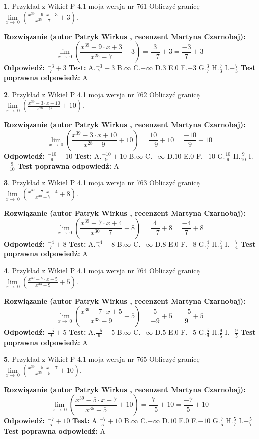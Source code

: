 \documentclass[12pt, a4paper]{article}
\theoremstyle{definition} %
\newtheorem{zad}{}
\newcommand{\zadStart}[1]{\begin{zad}#1\newline}
\newcommand{\zadStop}{\end{zad}}
\newcommand{\rozwStart}[2]{\noindent \textbf{Rozwiązanie (autor #1 , recenzent #2): }\newline}
\newcommand{\rozwStop}{\newline}
\newcommand{\odpStart}{\noindent \textbf{Odpowiedź:}\newline}
\newcommand{\odpStop}{\newline}
\newcommand{\testStart}{\noindent \textbf{Test:}\newline}
\newcommand{\testStop}{\newline}
\newcommand{\kluczStart}{\noindent \textbf{Test poprawna odpowiedź:}\newline}
\newcommand{\kluczStop}{\newline}
\begin{document}
\zadStart{Przykład z Wikieł P 4.1 moja wersja nr 761}
Obliczyć granicę $\lim\limits_{x\to\ 0}(\frac{x^{39}-9 \cdot x +3}{x^{25}-7}+3)$.
\zadStop
\rozwStart{Patryk Wirkus}{Martyna Czarnobaj}
$$\lim\limits_{x\to\ 0}(\frac{x^{39}-9 \cdot x +3}{x^{25}-7}+3)=\frac{3}{-7}+3=\frac{-3}{7}+3$$
\rozwStop
\odpStart
$\frac{-3}{7}+3$
\odpStop
\testStart
A.$\frac{-3}{7}+3$
B.$\infty$
C.$-\infty$
D.$3$
E.$0$
F.$-3$
G.$\frac{3}{7}$
H.$\frac{7}{3}$
I.$-\frac{7}{3}$
\testStop
\kluczStart
A
\kluczStop



\zadStart{Przykład z Wikieł P 4.1 moja wersja nr 762}
Obliczyć granicę $\lim\limits_{x\to\ 0}(\frac{x^{39}-3 \cdot x +10}{x^{28}-9}+10)$.
\zadStop
\rozwStart{Patryk Wirkus}{Martyna Czarnobaj}
$$\lim\limits_{x\to\ 0}(\frac{x^{39}-3 \cdot x +10}{x^{28}-9}+10)=\frac{10}{-9}+10=\frac{-10}{9}+10$$
\rozwStop
\odpStart
$\frac{-10}{9}+10$
\odpStop
\testStart
A.$\frac{-10}{9}+10$
B.$\infty$
C.$-\infty$
D.$10$
E.$0$
F.$-10$
G.$\frac{10}{9}$
H.$\frac{9}{10}$
I.$-\frac{9}{10}$
\testStop
\kluczStart
A
\kluczStop



\zadStart{Przykład z Wikieł P 4.1 moja wersja nr 763}
Obliczyć granicę $\lim\limits_{x\to\ 0}(\frac{x^{39}-7 \cdot x +4}{x^{30}-7}+8)$.
\zadStop
\rozwStart{Patryk Wirkus}{Martyna Czarnobaj}
$$\lim\limits_{x\to\ 0}(\frac{x^{39}-7 \cdot x +4}{x^{30}-7}+8)=\frac{4}{-7}+8=\frac{-4}{7}+8$$
\rozwStop
\odpStart
$\frac{-4}{7}+8$
\odpStop
\testStart
A.$\frac{-4}{7}+8$
B.$\infty$
C.$-\infty$
D.$8$
E.$0$
F.$-8$
G.$\frac{4}{7}$
H.$\frac{7}{4}$
I.$-\frac{7}{4}$
\testStop
\kluczStart
A
\kluczStop



\zadStart{Przykład z Wikieł P 4.1 moja wersja nr 764}
Obliczyć granicę $\lim\limits_{x\to\ 0}(\frac{x^{39}-7 \cdot x +5}{x^{33}-9}+5)$.
\zadStop
\rozwStart{Patryk Wirkus}{Martyna Czarnobaj}
$$\lim\limits_{x\to\ 0}(\frac{x^{39}-7 \cdot x +5}{x^{33}-9}+5)=\frac{5}{-9}+5=\frac{-5}{9}+5$$
\rozwStop
\odpStart
$\frac{-5}{9}+5$
\odpStop
\testStart
A.$\frac{-5}{9}+5$
B.$\infty$
C.$-\infty$
D.$5$
E.$0$
F.$-5$
G.$\frac{5}{9}$
H.$\frac{9}{5}$
I.$-\frac{9}{5}$
\testStop
\kluczStart
A
\kluczStop



\zadStart{Przykład z Wikieł P 4.1 moja wersja nr 765}
Obliczyć granicę $\lim\limits_{x\to\ 0}(\frac{x^{39}-5 \cdot x +7}{x^{35}-5}+10)$.
\zadStop
\rozwStart{Patryk Wirkus}{Martyna Czarnobaj}
$$\lim\limits_{x\to\ 0}(\frac{x^{39}-5 \cdot x +7}{x^{35}-5}+10)=\frac{7}{-5}+10=\frac{-7}{5}+10$$
\rozwStop
\odpStart
$\frac{-7}{5}+10$
\odpStop
\testStart
A.$\frac{-7}{5}+10$
B.$\infty$
C.$-\infty$
D.$10$
E.$0$
F.$-10$
G.$\frac{7}{5}$
H.$\frac{5}{7}$
I.$-\frac{5}{7}$
\testStop
\kluczStart
A
\kluczStop
\end{document}
